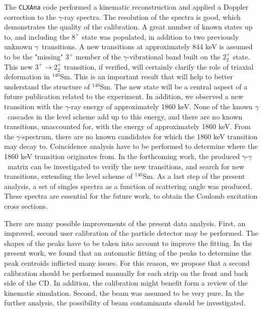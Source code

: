 \documentclass[twoside,english]{uiofysmaster/uiofysmaster}
\newcommand{\Sm}{$^{140}$Sm} %
\newcommand{\ga}{$\gamma$}
\begin{document}
The \texttt{CLXAna} code performed a kinematic reconstruction and applied a Doppler correction to the \ga-ray spectra.
The resolution of the spectra is good, which demonstrates the quality of the calibration.
A great number of known states up to, and including the $8^+$ state was populated, in addition to two previously unknown \ga\ transitions. 
A new transitions at approximately 844 keV is assumed to be the "missing" $3^+$ member of the \ga-vibrational band built on the $2_2^+$ state. 
This new $3^+ \rightarrow 2_2^+$ transition, if verified, will certainly clarify the role of triaxial deformation in \Sm.
This is an important result that will help to better understand the structure of \Sm. 
The new state will be a central aspect of a future publication related to the experiment.
In addition, we observed a new transition with the \ga-ray energy of approximately 1860 keV. 
None of the known \ga\ cascades in the level scheme add up to this energy, and there are no known transitions, unaccounted for, with the energy of approximately 1860 keV. 
From the \ga-spectrum, there are no known candidates for which the 1860 keV transition may decay to.
Coincidence analysis have to be performed to determine where the 1860 keV transition originates from.
In the forthcoming work, the produced \ga-\ga\ matrix can be investigated to verify the new transitions, and search for new transitions, extending the level scheme of \Sm. 
As a last step of the present analysis, a set of singles spectra as a function of scattering angle was produced. These spectra are essential for the future work, to obtain the Coulomb excitation cross sections. 

There are many possible improvements of the present data analysis. 
First, an improved, second user calibration of the particle detector may be performed. 
The shapes of the peaks have to be taken into account to improve the fitting. 
In the present work, we found that an automatic fitting of the peaks to determine the peak centroids inflicted many issues. 
For this reason, we propose that a second calibration should be performed manually for each strip on the front and back side of the CD. 
In addition, the calibration might benefit form a review of the kinematic simulation.
Second, the beam was assumed to be very pure. 
In the further analysis, the possibility of beam contaminants should be investigated.
\end{document}
